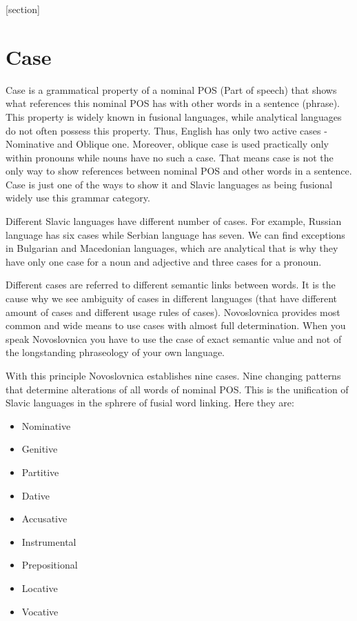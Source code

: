 [section]
\section{Case}

Case is a grammatical property of a nominal POS (Part of speech) that shows what references this nominal POS has with other words in a sentence (phrase). This property is widely known in fusional languages, while analytical languages do not often possess this property. Thus, English has only two active cases - Nominative and Oblique one. Moreover, oblique case is used practically only within pronouns while nouns have no such a case. That means case is not the only way to show references between nominal POS and other words in a sentence. Case is just one of the ways to show it and Slavic languages as being fusional widely use this grammar category.

Different Slavic languages have different number of cases. For example, Russian language has six cases while Serbian language has seven. We can find exceptions in Bulgarian and Macedonian languages, which are analytical that is why they have only one case for a noun and adjective and three cases for a pronoun.

Different cases are referred to different semantic links between words. It is the cause why we see ambiguity of cases in different languages (that have different amount of cases and different usage rules of cases). Novoslovnica provides most common and wide means to use cases with almost full determination. When you speak Novoslovnica you have to use the case of exact semantic value and not of the longstanding phraseology of your own language.

With this principle Novoslovnica establishes nine cases. Nine changing patterns that determine alterations of all words of nominal POS. This is the unification of Slavic languages in the sphrere of fusial word linking. Here they are:

\begin{itemize}
	\item Nominative
	\item Genitive
	\item Partitive
	\item Dative
	\item Accusative
	\item Instrumental
	\item Prepositional
	\item Locative
	\item Vocative
\end{itemize}

